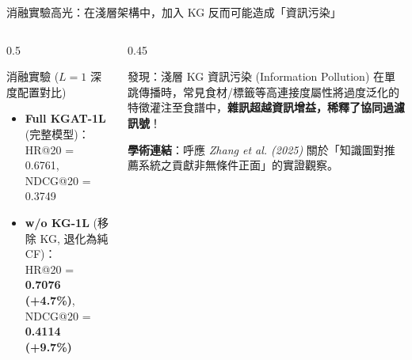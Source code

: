 \documentclass[aspectratio=169, 10pt]{beamer}
\begin{document}
\begin{frame}{消融實驗高光：在淺層架構中，加入 KG 反而可能造成「資訊污染」}
  \begin{columns}[T]
    \begin{column}{0.5\textwidth}
      \begin{block}{消融實驗 ($L=1$ 深度配置對比)}
        \begin{itemize}
          \item \textbf{Full KGAT-1L} (完整模型)：\\HR@20 = 0.6761, NDCG@20 = 0.3749
          \item \textbf{w/o KG-1L} (移除 KG, 退化為純 CF)：\\HR@20 = \textbf{0.7076 (\textcolor{HighlightRed}{+4.7\%})}, NDCG@20 = \textbf{0.4114 (\textcolor{HighlightRed}{+9.7\%})}
        \end{itemize}
      \end{block}
    \end{column}
    
    \begin{column}{0.45\textwidth}
      \begin{alertblock}{發現：淺層 KG 資訊污染 (Information Pollution)}
        在單跳傳播時，常見食材/標籤等高連接度屬性將過度泛化的特徵灌注至食譜中，\textbf{雜訊超越資訊增益，稀釋了協同過濾訊號}！
      \end{alertblock}
      \vspace{0.1cm}
      \small \textbf{學術連結}：呼應 \textit{Zhang et al. (2025)} 關於「知識圖對推薦系統之貢獻非無條件正面」的實證觀察。
    \end{column}
  \end{columns}
\end{frame}
\end{document}
